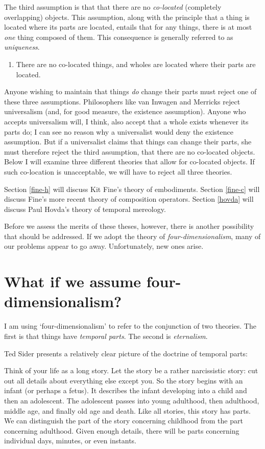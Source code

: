 \documentclass[12pt,twoside]{reedfancy}
\newenvironment{squote}{%
	\begin{spacing}{1}
	\begin{list}{}{%
	\setlength{\labelwidth}{0pt}%
	\rightmargin\leftmargin%
	}
	\item\relax
	}{%
	\end{list}%
	\end{spacing}
	}
\begin{document}
\begin{spacing}{1.25}
The third assumption is that that there are no {\em co-located}
(completely overlapping) objects.  This assumption, along with the
principle that a thing is located where its parts are located, entails
that for any things, there is at most {\em one} thing composed of
them.  This consequence is generally referred to as {\em uniqueness}.

\begin{enumerate}[start=3, ref=(\arabic*)]
  \item There are no co-located things, and wholes are located where
    their parts are located. \label{ass-co}
\end{enumerate}

Anyone wishing to maintain that things {\em do} change their parts
must reject one of these three assumptions.  Philosophers like van
Inwagen and Merricks reject universalism (and, for good measure, the
existence assumption).  Anyone who accepts universalism will, I think,
also accept that a whole exists whenever its parts do; I can see no
reason why a universalist would deny the existence assumption.  But if
a universalist claims that things can change their parts, she must
therefore reject the third assumption, that there are no co-located
objects.  Below I will examine three different theories that allow for
co-located objects.  If such co-location is unacceptable, we will have
to reject all three theories.

Section \ref{fine-h} will discuss Kit Fine's theory of embodiments.
Section \ref{fine-c} will discuss Fine's more recent theory of
composition operators.  Section \ref{hovda} will discuss Paul Hovda's
theory of temporal mereology.

Before we assess the merits of these theses, however, there is another
possibility that should be addressed.  If we adopt the theory of {\em
  four-dimensionalism}, many of our problems appear to go away.
Unfortunately, new ones arise.

\section{What if we assume four-dimensionalism?}
\label{4d}
I am using `four-dimensionalism' to refer to the conjunction of two
theories.  The first is that things have {\em temporal parts}.  The
second is {\em eternalism}.

Ted Sider presents a relatively clear picture of the doctrine of
temporal parts:

\begin{squote}
Think of your life as a long story.  Let the story be a rather
narcissistic story: cut out all details about everything else except
you.  So the story begins with an infant (or perhaps a fetus).  It
describes the infant developing into a child and then an adolescent.
The adolescent passes into young adulthood, then adulthood, middle
age, and finally old age and death.  Like all stories, this story has
parts.  We can distinguish the part of the story concerning childhood
from the part concerning adulthood.  Given enough details, there will
be parts concerning individual days, minutes, or even instants.


\end{squote}
\end{spacing}
\end{document}
